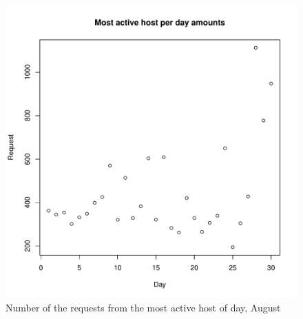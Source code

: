 \documentclass[english]{article}
\begin{document}
\begin{figure}[H]
\centerline{\includegraphics{Weblogs/Aug/MostActiveHostPerDayAmounts.pdf}}
\caption{Number of the requests from the most active host of day, August}
\end{figure}
\end{document}
